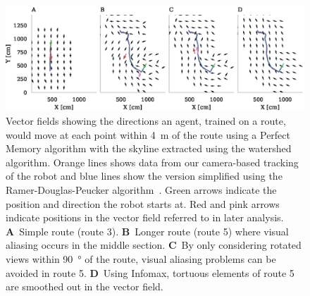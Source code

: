 \documentclass[letterpaper]{article}
\begin{document}
\begin{figure}[t]
    \centering
    \includegraphics{figures/vector_field.eps}
    \caption{Vector fields showing the directions an agent, trained on a route, would move at each point within \SI{4}{\metre} of the route using a Perfect Memory algorithm with the skyline extracted using the watershed algorithm. 
    Orange lines shows data from our camera-based tracking of the robot and blue lines show the version simplified using the Ramer-Douglas-Peucker algorithm~\citep{Ramer1972}.
    Green arrows indicate the position and direction the robot starts at.
    Red and pink arrows indicate positions in the vector field referred to in later analysis.
    \textbf{A}~Simple route (route 3).
    \textbf{B}~Longer route (route 5) where visual aliasing occurs in the middle section.
    \textbf{C}~By only considering rotated views within \SI{90}{\degree} of the route, visual aliasing problems can be avoided in route 5.
    \textbf{D}~Using Infomax, tortuous elements of route 5 are smoothed out in the vector field.}
    \label{fig:vector_fields}
\end{figure}
\end{document}
